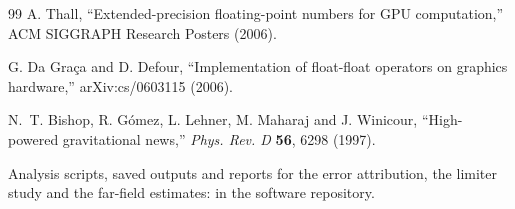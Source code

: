 \documentclass[11pt, a4paper]{article}
\begin{document}
\begin{thebibliography}{99}
A. Thall, ``Extended-precision floating-point numbers for GPU computation,'' ACM SIGGRAPH Research Posters (2006).

G. Da Gra\c{c}a and D. Defour, ``Implementation of float-float operators on graphics hardware,'' arXiv:cs/0603115 (2006).

N.~T. Bishop, R. G\'omez, L. Lehner, M. Maharaj and J. Winicour, ``High-powered gravitational news,'' \textit{Phys. Rev. D} \textbf{56}, 6298 (1997).

Analysis scripts, saved outputs and reports for the error attribution, the limiter study and the far-field estimates:  in the software repository.

\end{thebibliography}
\end{document}
